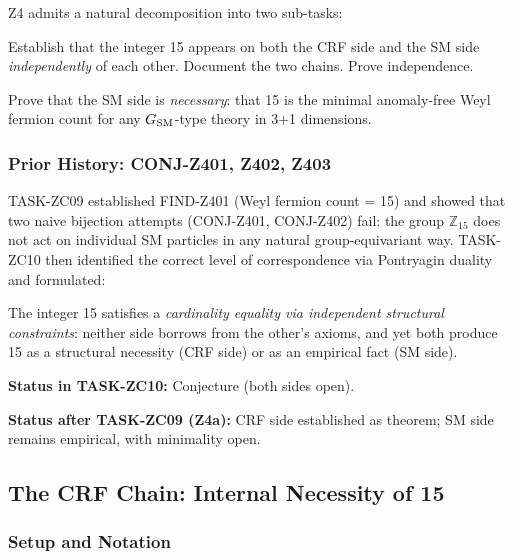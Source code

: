 \documentclass[12pt, a4paper]{article}
\begin{document}
Z4 admits a natural decomposition into two sub-tasks:

\begin{description}[leftmargin=*]
  \item[Z4a (this paper):] Establish that the integer 15 appears on
    both the CRF side and the SM side \emph{independently} of each
    other. Document the two chains. Prove independence.
  \item[Z4b (open):] Prove that the SM side is \emph{necessary}:
    that 15 is the minimal anomaly-free Weyl fermion count for
    any $G_{\rm SM}$-type theory in 3+1 dimensions.
\end{description}

\subsubsection{Prior History: CONJ-Z401, Z402, Z403}

TASK-ZC09 established FIND-Z401 (Weyl fermion count = 15) and showed
that two naive bijection attempts (CONJ-Z401, CONJ-Z402) fail: the
group $\mathbb{Z}_{15}$ does not act on individual SM particles in
any natural group-equivariant way. TASK-ZC10 then identified the
correct level of correspondence via Pontryagin duality and formulated:

\begin{formalbox}[title={CONJ-Z403 (as stated in TASK-ZC10)}]
The integer 15 satisfies a \emph{cardinality equality via independent
structural constraints}: neither side borrows from the other's axioms,
and yet both produce 15 as a structural necessity (CRF side) or as
an empirical fact (SM side).

\textbf{Status in TASK-ZC10:} Conjecture (both sides open).

\textbf{Status after TASK-ZC09 (Z4a):} CRF side established as
theorem; SM side remains empirical, with minimality open.
\end{formalbox}

\subsection{The CRF Chain: Internal Necessity of 15}
\label{sec:crf-chain}

\subsubsection{Setup and Notation}
\end{document}
